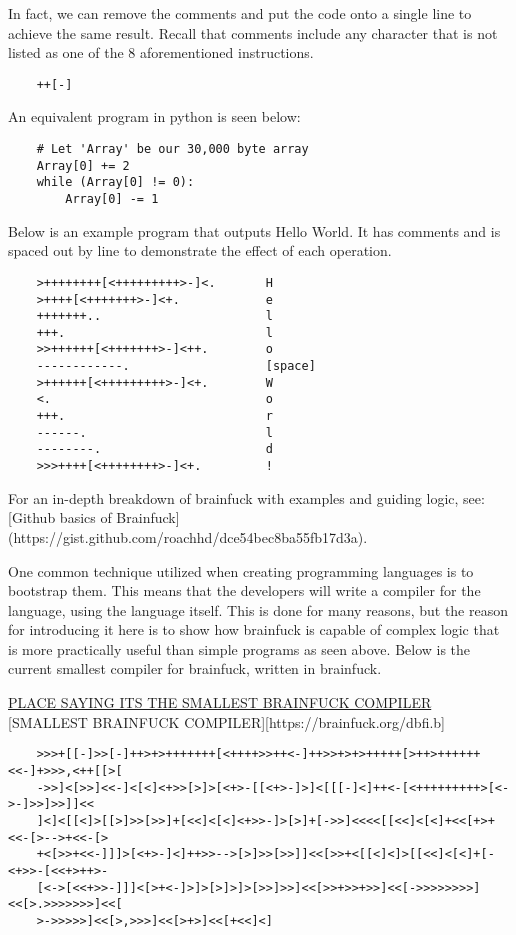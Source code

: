 In fact, we can remove the comments and put the code onto a single line to achieve the same result.
Recall that comments include any character that is not listed as one of the 8 aforementioned instructions.

\begin{verbatim}
    ++[-]
\end{verbatim}

An equivalent program in python is seen below:

\begin{verbatim}
    # Let 'Array' be our 30,000 byte array
    Array[0] += 2
    while (Array[0] != 0):
        Array[0] -= 1
\end{verbatim}

Below is an example program that outputs Hello World.
It has comments and is spaced out by line to demonstrate the effect of each operation.

\begin{verbatim}
    >++++++++[<+++++++++>-]<.       H
    >++++[<+++++++>-]<+.            e
    +++++++..                       l
    +++.                            l
    >>++++++[<+++++++>-]<++.        o
    ------------.                   [space]
    >++++++[<+++++++++>-]<+.        W
    <.                              o
    +++.                            r
    ------.                         l
    --------.                       d
    >>>++++[<++++++++>-]<+.         !
\end{verbatim}

For an in-depth breakdown of brainfuck with examples and guiding logic, see: [Github basics of Brainfuck](https://gist.github.com/roachhd/dce54bec8ba55fb17d3a).

One common technique utilized when creating programming languages is to bootstrap them.
This means that the developers will write a compiler for the language, using the language itself.
This is done for many reasons, but the reason for introducing it here is to show how brainfuck is capable of complex logic that is more practically useful than simple programs as seen above.
Below is the current smallest compiler for brainfuck, written in brainfuck.

\href{https://esolangs.org/wiki/Brainfuck#Self-interpreters}{PLACE SAYING ITS THE SMALLEST BRAINFUCK COMPILER}
[SMALLEST BRAINFUCK COMPILER][https://brainfuck.org/dbfi.b]

\begin{verbatim}
    >>>+[[-]>>[-]++>+>+++++++[<++++>>++<-]++>>+>+>+++++[>++>++++++<<-]+>>>,<++[[>[
    ->>]<[>>]<<-]<[<]<+>>[>]>[<+>-[[<+>-]>]<[[[-]<]++<-[<+++++++++>[<->-]>>]>>]]<<
    ]<]<[[<]>[[>]>>[>>]+[<<]<[<]<+>>-]>[>]+[->>]<<<<[[<<]<[<]+<<[+>+<<-[>-->+<<-[>
    +<[>>+<<-]]]>[<+>-]<]++>>-->[>]>>[>>]]<<[>>+<[[<]<]>[[<<]<[<]+[-<+>>-[<<+>++>-
    [<->[<<+>>-]]]<[>+<-]>]>[>]>]>[>>]>>]<<[>>+>>+>>]<<[->>>>>>>>]<<[>.>>>>>>>]<<[
    >->>>>>]<<[>,>>>]<<[>+>]<<[+<<]<]
\end{verbatim}

